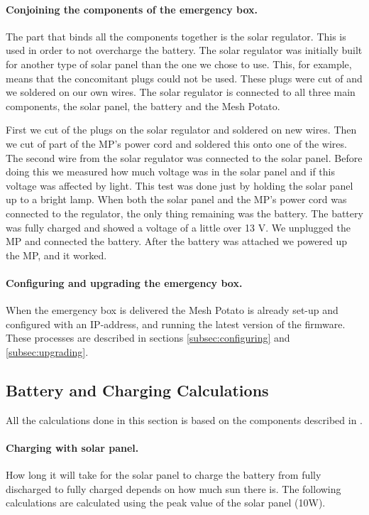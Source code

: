\paragraph{Conjoining the components of the emergency box.}
The part that binds all the components together is the solar regulator. This is used in order to not overcharge the battery. The solar regulator was initially built for another type of solar panel than the one we chose to use. This, for example, means that the concomitant plugs could not be used. These plugs were cut of and we soldered on our own wires. The solar regulator is connected to all three main components, the solar panel, the battery and the Mesh Potato. 

First we cut of the plugs on the solar regulator and soldered on new wires. Then we cut of part of the MP's power cord and soldered this onto one of the wires. The second wire from the solar regulator was connected to the solar panel. Before doing this we measured how much voltage was in the solar panel and if this voltage was affected by light. This test was done just by holding the solar panel up to a bright lamp. When both the solar panel and the MP's power cord was connected to the regulator, the only thing remaining was the battery. The battery was fully charged and showed a voltage of a little over 13 V. We unplugged the MP and connected the battery. After the battery was attached we powered up the MP, and it worked. 

\paragraph{Configuring and upgrading the emergency box.}
When the emergency box is delivered the Mesh Potato is already set-up and configured with an IP-address, and running the latest version of the firmware. These processes are described in sections \ref{subsec:configuring} and \ref{subsec:upgrading}.


\subsection{Battery and Charging Calculations}
All the calculations done in this section is based on the components described in . 

\paragraph{Charging with solar panel.}
How long it will take for the solar panel to charge the battery from fully discharged to fully charged depends on how much sun there is. The following calculations are calculated using the peak value of the solar panel (10W). 

